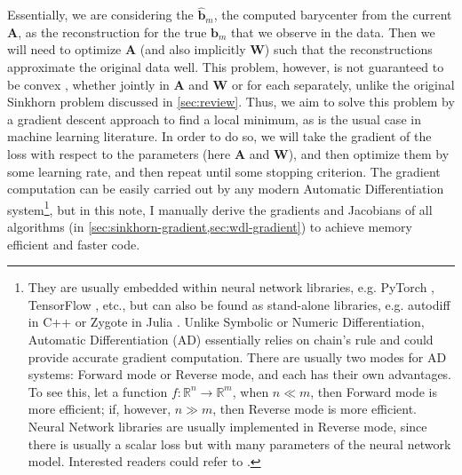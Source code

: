 Essentially, we are considering the $\widehat{\mathbf{b}}_m$,
the computed barycenter from the current $\mathbf{A}$,
as the reconstruction for the true $\mathbf{b}_m$ that we observe in the data.
Then we will need to optimize $\mathbf{A}$ (and also implicitly $\mathbf{W}$)
such that the reconstructions approximate the original data well.
This problem, however, is not guaranteed to be convex \citep{schmitz2018},
whether jointly in $\mathbf{A}$ and $\mathbf{W}$ or for each separately,
unlike the original Sinkhorn problem discussed in \cref{sec:review}.
Thus, we aim to solve this problem by a gradient descent approach to find a local minimum,
as is the usual case in machine learning literature.
In order to do so, we will take the gradient of the loss with respect to the parameters
(here $\mathbf{A}$ and $\mathbf{W}$), and then optimize them by some learning rate,
and then repeat until some stopping criterion.
The gradient computation can be easily carried out by any modern Automatic Differentiation system\footnote{
  They are usually embedded within neural network libraries, e.g. PyTorch \citep{paszke2017}, TensorFlow \citep{abadi2016}, etc.,
  but can also be found as stand-alone libraries, e.g. autodiff in C++ \citep{leal2018} or Zygote in Julia \citep{innes2019}.
  Unlike Symbolic or Numeric Differentiation, Automatic Differentiation (AD) essentially relies on chain's rule
  and could provide accurate gradient computation.
  There are usually two modes for AD systems: Forward mode or Reverse mode, and each has their own advantages.
  To see this,
  let a function $f: \mathbb{R}^n \to \mathbb{R}^m$, when $n \ll m$, then Forward mode is more efficient;
  if, however, $n \gg m$, then Reverse mode is more efficient.
  Neural Network libraries are usually implemented in Reverse mode,
  since there is usually a scalar loss but with many parameters of the neural network model.
  Interested readers could refer to \citet[Chapter 8]{nocedal2006}.
}, but in this note, I manually derive the gradients and Jacobians of all algorithms (in \cref{sec:sinkhorn-gradient,sec:wdl-gradient}) to achieve memory efficient and faster code.

